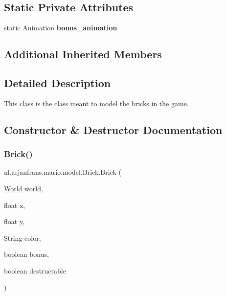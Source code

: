 \subsection*{Static Private Attributes}
\begin{DoxyCompactItemize}
\item 
\mbox{\label{classnl_1_1arjanfrans_1_1mario_1_1model_1_1Brick_a3ccb1a16df0627a2a15ef1972f950f51}} 
static Animation {\bfseries bonus\+\_\+animation}
\end{DoxyCompactItemize}
\subsection*{Additional Inherited Members}


\subsection{Detailed Description}
This class is the class meant to model the bricks in the game. 

\subsection{Constructor \& Destructor Documentation}
\mbox{\label{classnl_1_1arjanfrans_1_1mario_1_1model_1_1Brick_addfb506d6f243693b69d579b2cedb3ec}} 
\subsubsection{\texorpdfstring{Brick()}{Brick()}}
{\footnotesize\ttfamily nl.\+arjanfrans.\+mario.\+model.\+Brick.\+Brick (\begin{DoxyParamCaption}\item[{\hyperlink{classnl_1_1arjanfrans_1_1mario_1_1model_1_1World}{World}}]{world,  }\item[{float}]{x,  }\item[{float}]{y,  }\item[{String}]{color,  }\item[{boolean}]{bonus,  }\item[{boolean}]{destructable }\end{DoxyParamCaption})}



